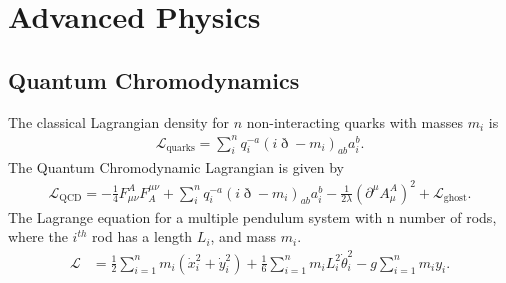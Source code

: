 \chapter{Advanced Physics}
\thispagestyle{fancy}
\section{Quantum Chromodynamics}
The classical Lagrangian density for $n$ non-interacting quarks with masses $m_i$ is 
\begin{align}
\mathcal{L}_{\textrm{quarks}}=\sum_{i}^{n}q_i^{-a}(i\eth-m_i)_{ab}a_i^b.
\end{align}
The Quantum Chromodynamic Lagrangian is given by
\begin{align}
\mathcal{L}_{\textrm{QCD}}=-\frac{1}{4}F^A_{\mu\nu}F^{\mu\nu}_A+\sum_{i}^{n}q_i^{-a}(i\eth-m_i)_{ab}a_i^b-\frac{1}{2\lambda}(\partial^\mu A^A_\mu)^2+\mathcal{L}_{\textrm{ghost}}.
\end{align}
The Lagrange equation for a multiple pendulum system with n number of rods, where the $i^{th}$ rod has a length $L_i$, and mass $m_i$.
\begin{align}
\mathcal{L}&=\frac{1}{2}\sum_{i=1}^{n}m_i(\dot{x}^2_i+\dot{y}^2_i)+\frac{1}{6}\sum_{i=1}^{n}m_iL_i^2\dot{\theta}_i^2-g\sum_{i=1}^{n}m_iy_i.
\end{align}



